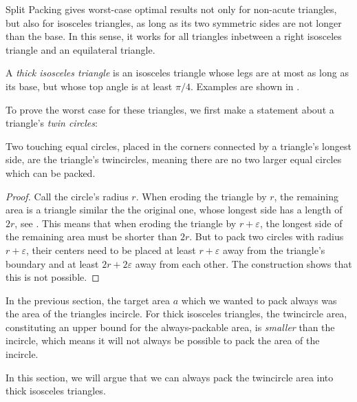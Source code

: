 \documentclass[a4paper,style=print,oneside,bibliography=totoc,nexus,lnum,extramargin]{tubsbook}
\begin{document}
Split Packing gives worst-case optimal results not only for non-acute triangles, but also for isosceles triangles, as long as its two symmetric sides are not longer than the base. In this sense, it works for all triangles inbetween a right isosceles triangle and an equilateral triangle.

\begin{definition}
    A \emph{thick isosceles triangle} is an isosceles triangle whose legs are at most as long as its base, but whose top angle is at least $\pi/4$. Examples are shown in .
\end{definition}


To prove the worst case for these triangles, we first make a statement about a triangle's \emph{twin circles}:

\begin{lemma}\label{th:iso-worst}
    Two touching equal circles, placed in the corners connected by a triangle's longest side, are the triangle's twincircles, meaning there are no two larger equal circles which can be packed.
\end{lemma}

\begin{proof}
    Call the circle's radius $r$.
    When eroding the triangle by $r$, the remaining area is a triangle similar the the original one, whose longest side has a length of $2r$, see . This means that when eroding the triangle by $r+\varepsilon$, the longest side of the remaining area must be shorter than $2r$.
    But to pack two circles with radius $r+\varepsilon$, their centers need to be placed at least $r+\varepsilon$ away from the triangle's boundary and at least $2r+2\varepsilon$ away from each other. The construction shows that this is not possible.
\end{proof}


In the previous section, the target area $a$ which we wanted to pack always was the area of the triangles incircle. For thick isosceles triangles, the twincircle area, constituting an upper bound for the always-packable area, is \emph{smaller} than the incircle, which means it will not always be possible to pack the area of the incircle.

In this section, we will argue that we can always pack the twincircle area into thick isosceles triangles.
\end{document}
